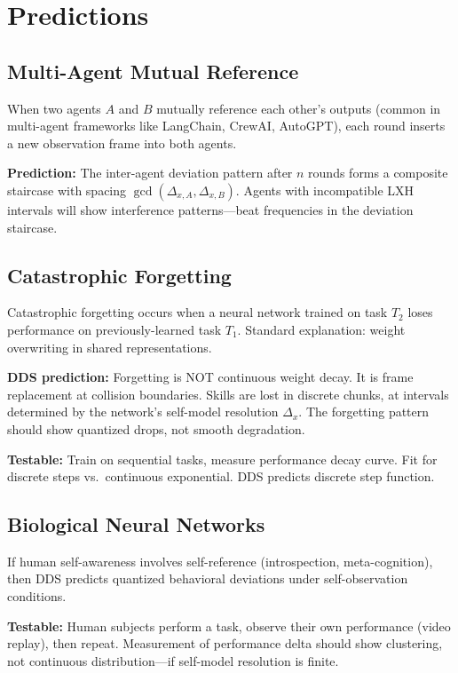 \documentclass[11pt,a4paper]{article}
\begin{document}
\section{Predictions}

\subsection{Multi-Agent Mutual Reference}

When two agents $A$ and $B$ mutually reference each other's outputs (common in multi-agent frameworks like LangChain, CrewAI, AutoGPT), each round inserts a new observation frame into both agents.

\textbf{Prediction:} The inter-agent deviation pattern after $n$ rounds forms a composite staircase with spacing $\gcd(\Delta_{x,A}, \Delta_{x,B})$. Agents with incompatible LXH intervals will show interference patterns---beat frequencies in the deviation staircase.

\subsection{Catastrophic Forgetting}

Catastrophic forgetting occurs when a neural network trained on task $T_2$ loses performance on previously-learned task $T_1$. Standard explanation: weight overwriting in shared representations.

\textbf{DDS prediction:} Forgetting is NOT continuous weight decay. It is frame replacement at collision boundaries. Skills are lost in discrete chunks, at intervals determined by the network's self-model resolution $\Delta_x$. The forgetting pattern should show quantized drops, not smooth degradation.

\textbf{Testable:} Train on sequential tasks, measure performance decay curve. Fit for discrete steps vs.\ continuous exponential. DDS predicts discrete step function.

\subsection{Biological Neural Networks}

If human self-awareness involves self-reference (introspection, meta-cognition), then DDS predicts quantized behavioral deviations under self-observation conditions.

\textbf{Testable:} Human subjects perform a task, observe their own performance (video replay), then repeat. Measurement of performance delta should show clustering, not continuous distribution---if self-model resolution is finite.
\end{document}
